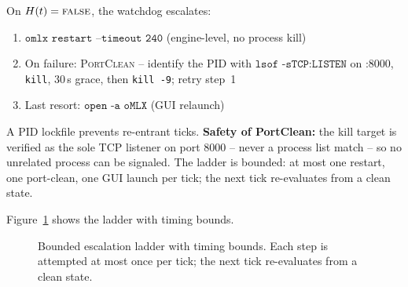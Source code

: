 \documentclass[10pt]{article}
\begin{document}
On $H(t)=\textsc{false}$, the watchdog escalates:
\begin{enumerate}[nosep]
  \item $\texttt{omlx restart --timeout 240}$ (engine-level, no process kill)
  \item On failure: \textsc{PortClean} -- identify the PID with $\texttt{lsof -sTCP:LISTEN}$ on :8000, \texttt{kill}, 30\,s grace, then \texttt{kill -9}; retry step~1
  \item Last resort: $\texttt{open -a oMLX}$ (GUI relaunch)
\end{enumerate}

A PID lockfile prevents re-entrant ticks. \textbf{Safety of PortClean:} the kill target is verified as the sole TCP listener on port 8000 -- never a process list match -- so no unrelated process can be signaled. The ladder is bounded: at most one restart, one port-clean, one GUI launch per tick; the next tick re-evaluates from a clean state.

Figure~\ref{fig:ladder} shows the ladder with timing bounds.

\begin{figure}[t]\centering
{}
\caption{Bounded escalation ladder with timing bounds. Each step is attempted at most once per tick; the next tick re-evaluates from a clean state.}
\label{fig:ladder}
\end{figure}
\end{document}
